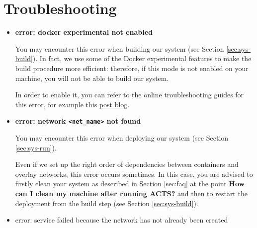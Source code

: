 \section{Troubleshooting}

\begin{itemize}

\item \textbf{error: docker experimental not enabled}

You may encounter this error when building our system (see Section
\ref{sec:sys-build}).
In fact, we use some of the Docker experimental features to make the build
procedure more efficient: therefore, if this mode is not enabled on your
machine, you will not be able to build our system.

In order to enable it, you can refer to the online troubleshooting guides for
this error, for example this
\href{https://sreeninet.wordpress.com/2017/01/27/docker-1-13-experimental-features/}{post blog}.

\item \textbf{error: network \texttt{<net\_name>} not found}

You may encounter this error when deploying our system (see Section
\ref{sec:sys-run}).

Even if we set up the right order of dependencies between containers and
overlay networks, this error occurs sometimes.
In this case, you are advised to firstly clean your system as described in
Section \ref{sec:faq} at the point \textbf{How can I clean my machine after
running ACTS?} and then to restart the deployment from the build step (see
Section \ref{sec:sys-build}).

\item error: service failed because the network has not already been created

\end{itemize}

